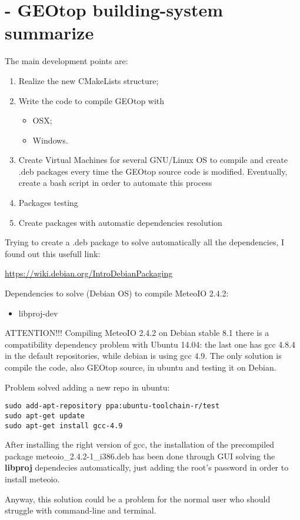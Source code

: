 \section{ - GEOtop building-system summarize}\label{sec:20150716}

The main development points are:

\begin{enumerate}
\item Realize the new CMakeLists structure;
\item Write the code to compile GEOtop with
  \begin{itemize}
    \item OSX;
    \item Windows.
  \end{itemize}
\item Create Virtual Machines for several GNU/Linux OS to compile and create .deb packages every time the GEOtop source code is modified. Eventually, create a bash script in order to automate this process
\item Packages testing
\item Create packages with automatic dependencies resolution
\end{enumerate}

Trying to create a .deb package to solve automatically all the dependencies, I found out this usefull link:

\url{https://wiki.debian.org/IntroDebianPackaging}

\noindent Dependencies to solve (Debian OS) to compile MeteoIO 2.4.2:

\begin{itemize}
\item libproj-dev
\end{itemize}

ATTENTION!!! Compiling MeteoIO 2.4.2 on Debian stable 8.1 there is a compatibility dependency problem with Ubuntu 14.04: the last one has gcc 4.8.4 in the default repositories, while debian is using gcc 4.9. The only solution is compile the code, also GEOtop source, in ubuntu and testing it on Debian.

Problem solved adding a new repo in ubuntu:

\begin{lstlisting}[style=bashStyle]
sudo add-apt-repository ppa:ubuntu-toolchain-r/test
sudo apt-get update
sudo apt-get install gcc-4.9
\end{lstlisting}
After installing the right version of gcc, the installation of the precompiled package meteoio\_2.4.2-1\_i386.deb has been done through GUI solving the \textbf{libproj} dependecies automatically, just adding the root's password in order to install meteoio.

Anyway, this solution could be a problem for the normal user who should struggle with command-line and terminal.
